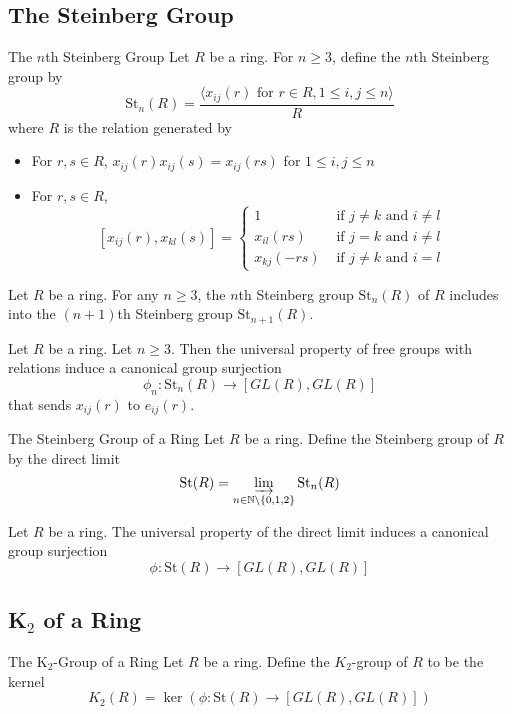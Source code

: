 \documentclass[a4paper]{article}
\begin{document}
\subsection{The Steinberg Group}
\begin{defn}{The $n$th Steinberg Group}{} Let $R$ be a ring. For $n\geq 3$, define the $n$th Steinberg group by $$\text{St}_n(R)=\frac{\langle x_{ij}(r)\text{ for }r\in R, 1\leq i,j\leq n\rangle}{R}$$ where $R$ is the relation generated by 
\begin{itemize}
\item For $r,s\in R$, $x_{ij}(r)x_{ij}(s)=x_{ij}(rs)$ for $1\leq i,j\leq n$
\item For $r,s\in R$, $$[x_{ij}(r),x_{kl}(s)]=\begin{cases}
1 & \text{ if } j\neq k\text{ and }i\neq l\\
x_{il}(rs) & \text{ if } j=k \text{ and }i\neq l\\
x_{kj}(-rs) & \text{ if } j\neq k\text{ and }i=l
\end{cases}$$
\end{itemize}
\end{defn}

\begin{lmm}{}{} Let $R$ be a ring. For any $n\geq 3$, the $n$th Steinberg group $\text{St}_n(R)$ of $R$ includes into the $(n+1)$th Steinberg group $\text{St}_{n+1}(R)$. 
\end{lmm}

\begin{prp}{}{} Let $R$ be a ring. Let $n\geq 3$. Then the universal property of free groups with relations induce a canonical group surjection $$\phi_n:\text{St}_n(R)\to[GL(R),GL(R)]$$ that sends $x_{ij}(r)$ to $e_{ij}(r)$. 
\end{prp}

\begin{defn}{The Steinberg Group of a Ring}{} Let $R$ be a ring. Define the Steinberg group of $R$ by the direct limit $$\text{St}(R)=\varinjlim_{n\in\mathbb{N}\setminus\{0,1,2\}}\text{St}_n(R)$$
\end{defn}

\begin{prp}{}{} Let $R$ be a ring. The universal property of the direct limit induces a canonical group surjection $$\phi:\text{St}(R)\to[GL(R),GL(R)]$$
\end{prp}

\subsection{K${_2}$ of a Ring}
\begin{defn}{The K${_2}$-Group of a Ring}{} Let $R$ be a ring. Define the $K_2$-group of $R$ to be the kernel $$K_2(R)=\ker\left(\phi:\text{St}(R)\to[GL(R),GL(R)]\right)$$
\end{defn}
\end{document}
